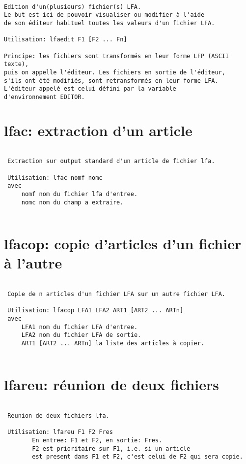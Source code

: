 \documentclass[10pt,french]{book}
\begin{document}
\begin{verbatim}
 
Edition d'un(plusieurs) fichier(s) LFA.
Le but est ici de pouvoir visualiser ou modifier à l'aide
de son éditeur habituel toutes les valeurs d'un fichier LFA.
 
Utilisation: lfaedit F1 [F2 ... Fn]
 
Principe: les fichiers sont transformés en leur forme LFP (ASCII texte),
puis on appelle l'éditeur. Les fichiers en sortie de l'éditeur,
s'ils ont été modifiés, sont retransformés en leur forme LFA.
L'éditeur appelé est celui défini par la variable
d'environnement EDITOR.

\end{verbatim}


\section{lfac: extraction d'un article}
\begin{verbatim}
  
 Extraction sur output standard d'un article de fichier lfa.
  
 Utilisation: lfac nomf nomc 
 avec
     nomf nom du fichier lfa d'entree.
     nomc nom du champ a extraire.
  
\end{verbatim}

\section{lfacop: copie d'articles d'un fichier à l'autre}
\begin{verbatim}
   
 Copie de n articles d'un fichier LFA sur un autre fichier LFA.
   
 Utilisation: lfacop LFA1 LFA2 ART1 [ART2 ... ARTn]
 avec
     LFA1 nom du fichier LFA d'entree.
     LFA2 nom du fichier LFA de sortie.
     ART1 [ART2 ... ARTn] la liste des articles à copier.
   
\end{verbatim}

\section{lfareu: réunion de deux fichiers}
\begin{verbatim}
  
 Reunion de deux fichiers lfa.
  
 Utilisation: lfareu F1 F2 Fres
        En entree: F1 et F2, en sortie: Fres.
        F2 est prioritaire sur F1, i.e. si un article
        est present dans F1 et F2, c'est celui de F2 qui sera copie.
  
\end{verbatim}
\end{document}
